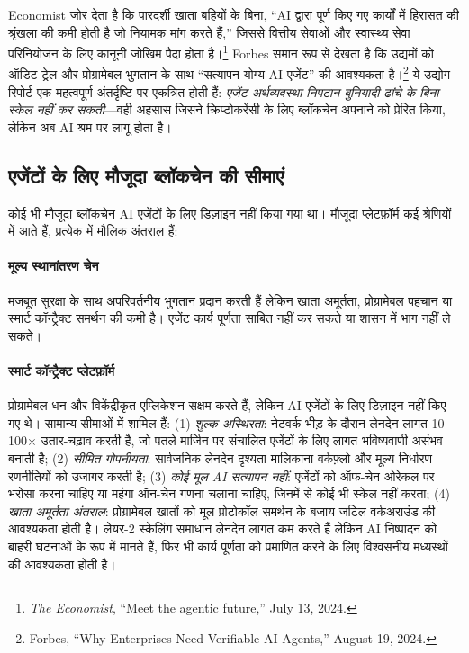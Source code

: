 \documentclass[11pt]{article}
\begin{document}
Economist जोर देता है कि पारदर्शी खाता बहियों के बिना, ``AI द्वारा पूर्ण किए गए कार्यों में हिरासत की श्रृंखला की कमी होती है जो नियामक मांग करते हैं,'' जिससे वित्तीय सेवाओं और स्वास्थ्य सेवा परिनियोजन के लिए कानूनी जोखिम पैदा होता है।\footnote{\emph{The Economist}, ``Meet the agentic future,'' July 13, 2024.} Forbes समान रूप से देखता है कि उद्यमों को ऑडिट ट्रेल और प्रोग्रामेबल भुगतान के साथ ``सत्यापन योग्य AI एजेंट'' की आवश्यकता है।\footnote{Forbes, ``Why Enterprises Need Verifiable AI Agents,'' August 19, 2024.} ये उद्योग रिपोर्ट एक महत्वपूर्ण अंतर्दृष्टि पर एकत्रित होती हैं: \emph{एजेंट अर्थव्यवस्था निपटान बुनियादी ढांचे के बिना स्केल नहीं कर सकती}---वही अहसास जिसने क्रिप्टोकरेंसी के लिए ब्लॉकचेन अपनाने को प्रेरित किया, लेकिन अब AI श्रम पर लागू होता है।

\subsection{एजेंटों के लिए मौजूदा ब्लॉकचेन की सीमाएं}
कोई भी मौजूदा ब्लॉकचेन AI एजेंटों के लिए डिज़ाइन नहीं किया गया था। मौजूदा प्लेटफ़ॉर्म कई श्रेणियों में आते हैं, प्रत्येक में मौलिक अंतराल हैं:

\paragraph{मूल्य स्थानांतरण चेन} मजबूत सुरक्षा के साथ अपरिवर्तनीय भुगतान प्रदान करती हैं लेकिन खाता अमूर्तता, प्रोग्रामेबल पहचान या स्मार्ट कॉन्ट्रैक्ट समर्थन की कमी है। एजेंट कार्य पूर्णता साबित नहीं कर सकते या शासन में भाग नहीं ले सकते।

\paragraph{स्मार्ट कॉन्ट्रैक्ट प्लेटफ़ॉर्म} प्रोग्रामेबल धन और विकेंद्रीकृत एप्लिकेशन सक्षम करते हैं, लेकिन AI एजेंटों के लिए डिज़ाइन नहीं किए गए थे। सामान्य सीमाओं में शामिल हैं: (1) \emph{शुल्क अस्थिरता}: नेटवर्क भीड़ के दौरान लेनदेन लागत 10--100$\times$ उतार-चढ़ाव करती है, जो पतले मार्जिन पर संचालित एजेंटों के लिए लागत भविष्यवाणी असंभव बनाती है; (2) \emph{सीमित गोपनीयता}: सार्वजनिक लेनदेन दृश्यता मालिकाना वर्कफ़्लो और मूल्य निर्धारण रणनीतियों को उजागर करती है; (3) \emph{कोई मूल AI सत्यापन नहीं}: एजेंटों को ऑफ-चेन ओरेकल पर भरोसा करना चाहिए या महंगा ऑन-चेन गणना चलाना चाहिए, जिनमें से कोई भी स्केल नहीं करता; (4) \emph{खाता अमूर्तता अंतराल}: प्रोग्रामेबल खातों को मूल प्रोटोकॉल समर्थन के बजाय जटिल वर्कअराउंड की आवश्यकता होती है। लेयर-2 स्केलिंग समाधान लेनदेन लागत कम करते हैं लेकिन AI निष्पादन को बाहरी घटनाओं के रूप में मानते हैं, फिर भी कार्य पूर्णता को प्रमाणित करने के लिए विश्वसनीय मध्यस्थों की आवश्यकता होती है।
\end{document}
